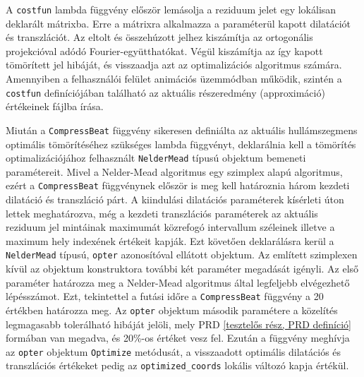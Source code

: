 \documentclass[oneside,titlepage,12pt,a4paper]{report}
\begin{document}
\par A \texttt{costfun} lambda függvény először lemásolja a reziduum jelet egy lokálisan deklarált mátrixba. Erre a mátrixra alkalmazza a paraméterül kapott dilatációt és transzlációt. Az eltolt és összehúzott jelhez kiszámítja az ortogonális projekcióval adódó Fourier-együtthatókat. Végül kiszámítja az így kapott tömörített jel hibáját, és visszaadja azt az optimalizációs algoritmus számára. Amennyiben a felhasználói felület animációs üzemmódban működik, szintén a \texttt{costfun} definíciójában található az aktuális részeredmény (approximáció) értékeinek fájlba írása. 
\par Miután a \texttt{CompressBeat} függvény sikeresen definiálta az aktuális hullámszegmens optimális tömörítéséhez szükséges lambda függvényt, deklarálnia kell a tömörítés optimalizációjához felhasznált \texttt{NelderMead} típusú objektum bemeneti paramétereit. Mivel a Nelder-Mead algoritmus egy szimplex alapú algoritmus, ezért a \texttt{CompressBeat} függvénynek először is meg kell határoznia három kezdeti dilatáció és transzláció párt. A kiindulási dilatációs paraméterek kísérleti úton lettek meghatározva, még a kezdeti transzlációs paraméterek az aktuális reziduum jel mintáinak maximumát közrefogó intervallum széleinek illetve a maximum hely indexének értékeit kapják. Ezt követően deklarálásra kerül a \texttt{NelderMead} típusú, \texttt{opter} azonosítóval ellátott objektum. Az említett szimplexen kívül az objektum konstruktora további két paraméter megadását igényli. Az első paraméter határozza meg a Nelder-Mead algoritmus által legfeljebb elvégezhető lépésszámot. Ezt, tekintettel a futási időre a \texttt{CompressBeat} függvény a 20 értékben határozza meg. Az \texttt{opter} objektum második paramétere a közelítés legmagasabb tolerálható hibáját jelöli, mely PRD \ref{tesztelős rész, PRD definíció} formában van megadva, és 20\%-os értéket vesz fel. Ezután a függvény meghívja az \texttt{opter} objektum \texttt{Optimize} metódusát, a visszaadott optimális dilatációs és transzlációs értékeket pedig az \texttt{optimized\_coords} lokális változó kapja értékül. 
\end{document}
